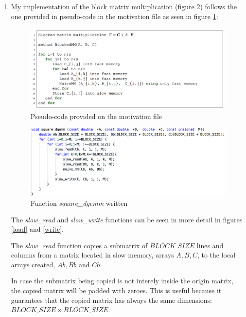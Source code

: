 \documentclass[unicode,11pt,a4paper,oneside,numbers=endperiod,openany]{scrartcl}
\begin{document}
    \begin{enumerate} %

        \item My implementation of the block matrix multiplication (figure \ref{code}) follows the one provided in pseudo-code in the motivation file as seen in figure \ref{pseudocode}:
            \begin{figure}[H]
                \includegraphics[width=\linewidth]{pseudocode}
                \caption{Pseudo-code provided on the motivation file}
                \label{pseudocode}
            \end{figure}

            \begin{figure}[H]
                \includegraphics[width=\linewidth]{code}
                \caption{Function \textit{square\_dgemm} written}
                \label{code}
            \end{figure}

            The \textit{slow\_read} and \textit{slow\_write} functions can be seen in more detail in figures \ref{load} and \ref{write}.

            The \textit{slow\_read} function copies a submatrix of $BLOCK\_SIZE$ lines and columns from a matrix located in slow memory, arrays $A, B, C$, to the local arrays created, $Ab, Bb$ and $Cb$.

            In case the submatrix being copied is not interely inside the origin matrix, the copied matrix will be padded with zeroes.
            This is useful because it guarantees that the copied matrix has always the same dimensions: $BLOCK\_SIZE \times BLOCK\_SIZE$.


\end{enumerate}
\end{document}
